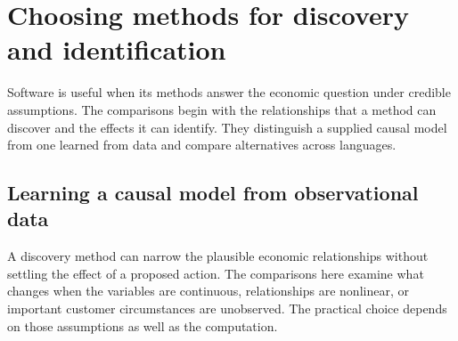 \documentclass[11pt,a4paper,openany]{book}
\begin{document}
\part{Choosing methods for discovery and identification}
\label{reading:part-methods}
Software is useful when its methods answer the economic question under
credible assumptions. The comparisons begin with the relationships that a
method can discover and the effects it can identify. They distinguish a supplied
causal model from one learned from data and compare alternatives across languages.











\chapter{Learning a causal model from observational data}
A discovery method can narrow the plausible economic relationships without
settling the effect of a proposed action. The comparisons here examine what
changes when the variables are continuous, relationships are nonlinear, or
important customer circumstances are unobserved. The practical choice depends
on those assumptions as well as the computation.












\end{document}
